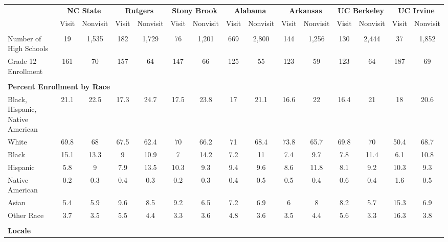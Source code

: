 \begin{tabular*}{\linewidth}{@{\extracolsep{\fill} } lcccccccccccccc}%
&\multicolumn{2}{c}{\bfseries NC State}&\multicolumn{2}{c}{\bfseries Rutgers}&\multicolumn{2}{c}{\bfseries Stony Brook}&\multicolumn{2}{c}{\bfseries Alabama}&\multicolumn{2}{c}{\bfseries Arkansas}&\multicolumn{2}{c}{\bfseries UC Berkeley}&\multicolumn{2}{c}{\bfseries UC Irvine}\\%
&Visit&\multicolumn{1}{l}{Nonvisit}&Visit&\multicolumn{1}{l}{Nonvisit}&Visit&\multicolumn{1}{l}{Nonvisit}&Visit&\multicolumn{1}{l}{Nonvisit}&Visit&\multicolumn{1}{l}{Nonvisit}&Visit&\multicolumn{1}{l}{Nonvisit}&Visit&\multicolumn{1}{l}{Nonvisit}\\%
\hline%
&&&&&&&&&&&&&&\\%
\hspace{0cm}Number of High Schools&19&1,535&182&1,729&76&1,201&669&2,800&144&1,256&130&2,444&37&1,852\\%
\hspace{0cm}Grade 12 Enrollment&161&70&157&64&147&66&125&55&123&59&123&64&187&69\\%
&&&&&&&&&&&&&&\\%
\multicolumn{15}{l}{\bfseries Percent Enrollment by Race}\\%
\hspace{0.2cm}Black, Hispanic, Native American&21.1&22.5&17.3&24.7&17.5&23.8&17&21.1&16.6&22&16.4&21&18&20.6\\%
\hspace{0.2cm}White&69.8&68&67.5&62.4&70&66.2&71&68.4&73.8&65.7&69.8&70&50.4&68.7\\%
\hspace{0.2cm}Black&15.1&13.3&9&10.9&7&14.2&7.2&11&7.4&9.7&7.8&11.4&6.1&10.8\\%
\hspace{0.2cm}Hispanic&5.8&9&7.9&13.5&10.3&9.3&9.4&9.6&8.6&11.8&8.1&9.2&10.3&9.3\\%
\hspace{0.2cm}Native American&0.2&0.3&0.4&0.3&0.2&0.3&0.4&0.5&0.5&0.4&0.6&0.4&1.6&0.5\\%
\hspace{0.2cm}Asian&5.4&5.9&9.6&8.5&9.2&6.5&7.2&6.9&6&8&8.2&5.7&15.3&6.9\\%
\hspace{0.2cm}Other Race&3.7&3.5&5.5&4.4&3.3&3.6&4.8&3.6&3.5&4.4&5.6&3.3&16.3&3.8\\%
&&&&&&&&&&&&&&\\%
\multicolumn{15}{l}{\bfseries Locale}\\%

\end{tabular*}
